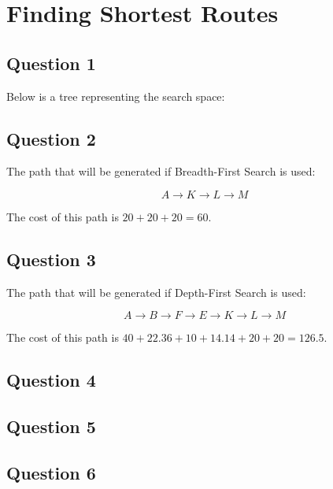 \section{Finding Shortest Routes}

  \subsection{Question 1}

  Below is a tree representing the search space:

  \begin{flushleft}
    
  \end{flushleft}

  \pagebreak

  \subsection{Question 2}

    The path that will be generated if Breadth-First Search is used:

      $$A \rightarrow K \rightarrow L \rightarrow M$$

    The cost of this path is $20 + 20 + 20 = 60$.

  \subsection{Question 3}

    The path that will be generated if Depth-First Search is used:

      $$A \rightarrow B \rightarrow F \rightarrow E \rightarrow K \rightarrow L
          \rightarrow M $$


    The cost of this path is $40+22.36+10+14.14+20+20=126.5$.

  \subsection{Question 4}

  \begin{flushleft}
    
  \end{flushleft}

  \subsection{Question 5}

  \subsection{Question 6}
